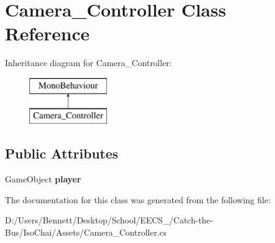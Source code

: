 \hypertarget{class_camera___controller}{}\section{Camera\+\_\+\+Controller Class Reference}
\label{class_camera___controller}
Inheritance diagram for Camera\+\_\+\+Controller\+:\begin{figure}[H]
\begin{center}
\leavevmode
\includegraphics[height=2.000000cm]{class_camera___controller}
\end{center}
\end{figure}
\subsection*{Public Attributes}
\begin{DoxyCompactItemize}
\item 
\mbox{\label{class_camera___controller_ade6273273a175ef48d14673299efb366}} 
Game\+Object {\bfseries player}
\end{DoxyCompactItemize}


The documentation for this class was generated from the following file\+:\begin{DoxyCompactItemize}
\item 
D\+:/\+Users/\+Bennett/\+Desktop/\+School/\+E\+E\+C\+S\+\_/\+Catch-\/the-\/\+Bus/\+Iso\+Chai/\+Assets/Camera\+\_\+\+Controller.\+cs\end{DoxyCompactItemize}
